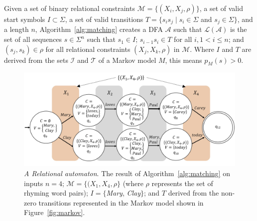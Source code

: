 \documentclass[phd,electronic,oneside,twosidetoc,letterpaper,chaptercenter,parttop,lof,lot]{byumsphd}
\begin{document}
\begin{algorithm}[!b]
\begin{algorithmic}
\end{algorithmic}
\end{algorithm}

Given a set of binary relational constraints $\mathcal{M} = \{(X_i,X_j,\rho)\}$, a set of valid start symbols $I\subset\Sigma$, a set of valid transitions $T=\{s_is_j\mid s_i\in\Sigma$ and $s_j\in\Sigma\}$, and a length $n$, Algorithm~\ref{alg:matching} creates a DFA $\mathcal{A}$ such that $\mathcal{L}(\mathcal{A})$ is the set of all sequences  $s\in\Sigma^n$ such that $s_1\in I$; $s_{i-1}s_i\in T$ for all $i, 1 < i \leq n$; and $(s_j,s_k)\in\rho$ for all relational constraints $(X_j,X_k,\rho)$ in $\mathcal{M}$. Where $I$ and $T$ are derived from the sets $\mathcal{I}$ and $\mathcal{T}$ of a Markov model $M$, this means $p_M(s) > 0$.

\begin{figure}
    \centering
    \includegraphics[width=.8\textwidth]{DFA}
    \caption{\textit{A {\sc Relational} automaton}. The result of Algorithm~\ref{alg:matching} on inputs $n=4$; $\mathcal{M}=\{(X_1,X_4,\rho\}$ (where $\rho$ represents the set of rhyming word pairs); $I=\{$\textit{Mary}, \textit{Clay}$\}$; and $T$ derived from the non-zero transitions represented in the Markov model shown in Figure~\ref{fig:markov}.}
    \label{fig:DFA}
\end{figure}
\end{document}
